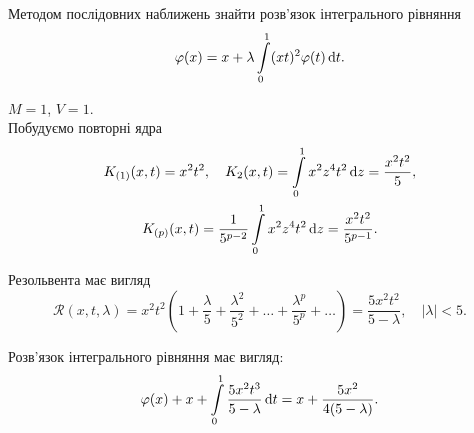 \begin{example}
	Методом послідовних наближень знайти розв’язок інтегрального рівняння \[\varphi(x) = x + \lambda \displaystyle\int\limits_0^1 (xt)^2 \varphi(t) \mathop{}\!\mathrm{d} t.\]
\end{example}
\begin{solution*}
	$M = 1$, $V = 1$. \\

	Побудуємо повторні ядра 
	\begin{multline*} 
		K_{(1)}(x, t) = x^2t^2, \quad K_2(x, t) = \displaystyle\int\limits_0^1 x^2 z^4 t^2 \mathop{}\!\mathrm{d} z = \dfrac{x^2t^2}{5}, \\ 
		K_{(p)}(x, t) = \dfrac{1}{5^{p - 2}} \displaystyle\int\limits_0^1 x^2 z^4 t^2 \mathop{}\!\mathrm{d} z = \dfrac{x^2t^2}{5^{p - 1}}.
	\end{multline*}
	
	Резольвента має вигляд \[\mathcal{R}(x, t, \lambda) = x^2 t^2 \left(1 + \frac{\lambda}{5} + \frac{\lambda^2}{5^2} + \ldots + \frac{\lambda^p}{5^p} + \ldots \right) = \frac{5x^2t^2}{5 - \lambda}, \quad |\lambda| < 5. \]

	Розв’язок інтегрального рівняння має вигляд: \[ \varphi(x) + x + \displaystyle\int\limits_0^1 \dfrac{5x^2t^3}{5 - \lambda} \mathop{}\!\mathrm{d} t = x + \dfrac{5x^2}{4(5 - \lambda)}. \]
\end{solution*}